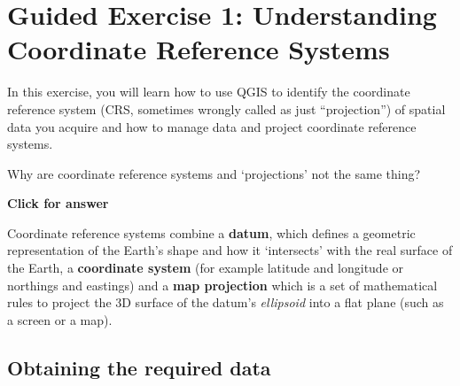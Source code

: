 \documentclass[
  letterpaper,
  DIV=11,
  numbers=noendperiod]{scrreprt}
\begin{document}
\section{Guided Exercise 1: Understanding Coordinate Reference
Systems}\label{guided-exercise-1-understanding-coordinate-reference-systems}

In this exercise, you will learn how to use QGIS to identify the
coordinate reference system (CRS, sometimes wrongly called as just
``projection'') of spatial data you acquire and how to manage data and
project coordinate reference systems.

\begin{tcolorbox}[enhanced jigsaw, breakable, toptitle=1mm, colback=white, left=2mm, leftrule=.75mm, titlerule=0mm, colframe=quarto-callout-important-color-frame, opacityback=0, title=\textcolor{quarto-callout-important-color}{\faExclamation}\hspace{0.5em}{Stop and Think}, toprule=.15mm, opacitybacktitle=0.6, bottomtitle=1mm, colbacktitle=quarto-callout-important-color!10!white, bottomrule=.15mm, coltitle=black, rightrule=.15mm, arc=.35mm]

Why are coordinate reference systems and `projections' not the same
thing?

\end{tcolorbox}

\begin{tcolorbox}[enhanced jigsaw, leftrule=.75mm, colframe=quarto-callout-important-color-frame, breakable, toprule=.15mm, bottomrule=.15mm, arc=.35mm, rightrule=.15mm, opacityback=0, colback=white, left=2mm]

\vspace{-3mm}\textbf{Click for answer}\vspace{3mm}

Coordinate reference systems combine a \textbf{datum}, which defines a
geometric representation of the Earth's shape and how it `intersects'
with the real surface of the Earth, a \textbf{coordinate system} (for
example latitude and longitude or northings and eastings) and a
\textbf{map projection} which is a set of mathematical rules to project
the 3D surface of the datum's \emph{ellipsoid} into a flat plane (such
as a screen or a map).

\end{tcolorbox}

\subsection{Obtaining the required
data}\label{obtaining-the-required-data}
\end{document}
